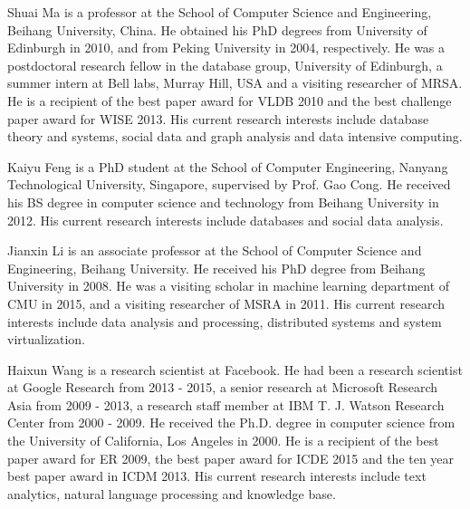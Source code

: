 \documentclass[10pt,journal,compsoc,twoside]{IEEEtran}
\begin{document}


\begin{IEEEbiography}{Shuai Ma} is a professor at the School of Computer Science and Engineering, Beihang University, China.
He obtained his PhD degrees from University of Edinburgh in 2010, and from
Peking University in 2004, respectively. He was a postdoctoral research fellow in the database group,
University of Edinburgh, a summer intern at Bell labs, Murray Hill, USA and a visiting researcher of MRSA.
He is a recipient of the best paper award for VLDB 2010 and the best challenge paper award for WISE 2013. His current research interests include database theory and systems, social data and graph analysis and data intensive computing.
\end{IEEEbiography}
\vspace{-6ex}
\begin{IEEEbiography}{Kaiyu Feng} is a PhD student at the School of Computer Engineering, Nanyang Technological University, Singapore, supervised by Prof. Gao Cong. He received his BS degree in computer science and technology from Beihang University in 2012. His current research interests include databases and social data analysis.
\end{IEEEbiography}
\vspace{-6ex}
\begin{IEEEbiography}{Jianxin Li} is an associate professor at the School of Computer Science and Engineering, Beihang University.  He received his PhD degree from Beihang University in 2008. He was a visiting scholar in machine learning department of CMU in 2015, and a visiting researcher of MSRA in 2011.  His current research interests include data analysis and processing, distributed systems and system virtualization.
\end{IEEEbiography}
\vspace{-6ex}
\begin{IEEEbiography}{Haixun Wang} is a research scientist at
Facebook. He had been a research scientist at Google Research from 2013 - 2015, a senior research at Microsoft
Research Asia from 2009 - 2013, a research staff member at IBM T. J. Watson
Research Center from 2000 - 2009. He received the Ph.D. degree
in computer science from the University of California, Los Angeles in
2000.  He  is a recipient of the best paper award for
ER 2009, the best paper award for ICDE 2015 and the ten year best paper award in ICDM 2013. His current research interests include text analytics, natural language processing and knowledge base.
\end{IEEEbiography}
\end{document}

